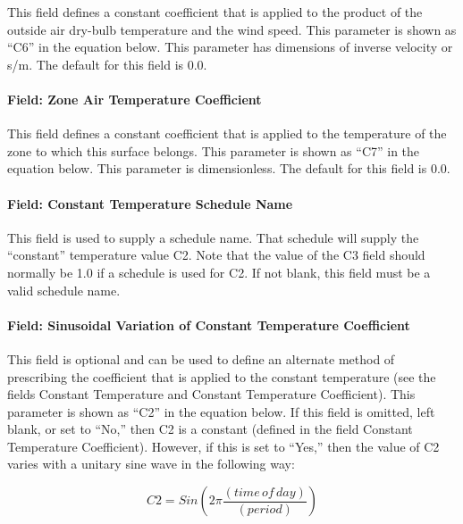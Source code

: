 This field defines a constant coefficient that is applied to the product of the outside air dry-bulb temperature and the wind speed. This parameter is shown as ``C6'' in the equation below. This parameter has dimensions of inverse velocity or s/m. The default for this field is 0.0.

\paragraph{Field: Zone Air Temperature Coefficient}\label{field-zone-air-temperature-coefficient}

This field defines a constant coefficient that is applied to the temperature of the zone to which this surface belongs. This parameter is shown as ``C7'' in the equation below. This parameter is dimensionless. The default for this field is 0.0.

\paragraph{Field: Constant Temperature Schedule Name}\label{field-constant-temperature-schedule-name}

This field is used to supply a schedule name. That schedule will supply the ``constant'' temperature value C2. Note that the value of the C3 field should normally be 1.0 if a schedule is used for C2. If not blank, this field must be a valid schedule name.

\paragraph{Field: Sinusoidal Variation of Constant Temperature Coefficient}\label{field-sinusoidal-variation-of-constant-temperature-coefficient}

This field is optional and can be used to define an alternate method of prescribing the coefficient that is applied to the constant temperature (see the fields Constant Temperature and Constant Temperature Coefficient). This parameter is shown as ``C2'' in the equation below. If this field is omitted, left blank, or set to ``No,'' then C2 is a constant (defined in the field Constant Temperature Coefficient). However, if this is set to ``Yes,'' then the value of C2 varies with a unitary sine wave in the following way:

\begin{equation}
C2 = Sin\left( {2\pi \frac{{\left( {time\,of\,day} \right)}}{{\left( {period} \right)}}} \right)
\end{equation}

